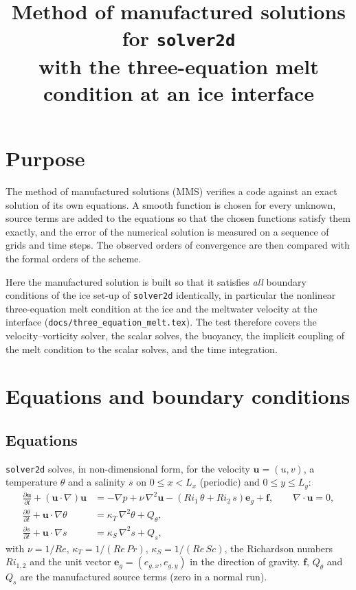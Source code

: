 \documentclass[11pt,a4paper]{article}
\title{Method of manufactured solutions for \texttt{solver2d}\\[0.3em]
\large with the three-equation melt condition at an ice interface}
\date{}
\newcommand{\pd}[2]{\frac{\partial #1}{\partial #2}}
\begin{document}
\maketitle

\section{Purpose}

The method of manufactured solutions (MMS) verifies a code against an exact solution of its own equations.
A smooth function is chosen for every unknown, source terms are added to the equations so that the chosen
functions satisfy them exactly, and the error of the numerical solution is measured on a sequence of grids
and time steps. The observed orders of convergence are then compared with the formal orders of the scheme.

Here the manufactured solution is built so that it satisfies \emph{all} boundary conditions of the ice
set-up of \texttt{solver2d} identically, in particular the nonlinear three-equation melt condition at the
ice and the meltwater velocity at the interface (\texttt{docs/three\_equation\_melt.tex}). The test
therefore covers the velocity--vorticity solver, the scalar solves, the buoyancy, the implicit coupling of
the melt condition to the scalar solves, and the time integration.

\section{Equations and boundary conditions}

\subsection{Equations}

\texttt{solver2d} solves, in non-dimensional form, for the velocity $\mathbf u=(u,v)$, a temperature
$\theta$ and a salinity $s$ on $0\le x<L_x$ (periodic) and $0\le y\le L_y$:
\begin{align}
  \pd{\mathbf u}{t} + (\mathbf u\cdot\nabla)\mathbf u &= -\nabla p + \nu\,\nabla^2\mathbf u
      - \left(Ri_1\,\theta + Ri_2\,s\right)\mathbf e_g + \mathbf f, \qquad \nabla\cdot\mathbf u = 0,
      \label{eq:mom}\\
  \pd{\theta}{t} + \mathbf u\cdot\nabla\theta &= \kappa_T\,\nabla^2\theta + Q_\theta, \label{eq:th}\\
  \pd{s}{t} + \mathbf u\cdot\nabla s &= \kappa_S\,\nabla^2 s + Q_s, \label{eq:s}
\end{align}
with $\nu=1/Re$, $\kappa_T=1/(Re\,Pr)$, $\kappa_S=1/(Re\,Sc)$, the Richardson numbers $Ri_{1,2}$ and the unit
vector $\mathbf e_g=(e_{g,x},e_{g,y})$ in the direction of gravity. $\mathbf f$, $Q_\theta$ and $Q_s$ are the
manufactured source terms (zero in a normal run).
\end{document}
